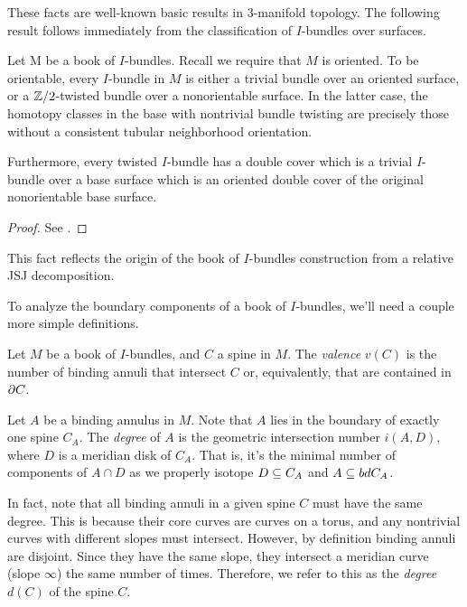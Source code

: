 These facts are well-known basic results in 3-manifold topology.  The following
result follows immediately from the classification of $I$-bundles over
surfaces.

\begin{prop}

Let M be a book of $I$-bundles. Recall we require that $M$ is oriented. To be
orientable, every $I$-bundle in $M$ is either a trivial bundle over an oriented
surface, or a $\mathbb{Z}/2$-twisted bundle over a nonorientable surface. In the
latter case, the homotopy classes in the base with nontrivial bundle twisting
are precisely those without a consistent tubular neighborhood orientation.

Furthermore, every twisted $I$-bundle has a double cover which is a trivial
$I$-bundle over a base surface which is an oriented double cover of the
original nonorientable base surface.

\end{prop}

\begin{proof}

See \cite[Theorem 10.5]{He}.

\end{proof}

This fact reflects the origin of the book of $I$-bundles construction from
a relative JSJ decomposition.

To analyze the boundary components of a book of $I$-bundles, we'll need
a couple more simple definitions.

\begin{defn}

Let $M$ be a book of $I$-bundles, and $C$ a spine in $M$.  The \emph{valence}
$v(C)$ is the number of binding annuli that intersect $C$ or, equivalently,
that are contained in $\partial C$.

Let $A$ be a binding annulus in $M$. Note that $A$ lies in the boundary of
exactly one spine $C_A$. The \emph{degree} of $A$ is the geometric intersection
number $i(A,D)$, where $D$ is a meridian disk of $C_A$. That is, it's the
minimal number of components of $A \cap D$ as we properly isotope $D \subseteq C_A$
and $A \subseteq bd C_A$.

In fact, note that all binding annuli in a given spine $C$ must have the same
degree. This is because their core curves are curves on a torus, and any
nontrivial curves with different slopes must intersect. However, by definition
binding annuli are disjoint. Since they have the same slope, they intersect
a meridian curve (slope $\infty$) the same number of times.  Therefore, we
refer to this as the \emph{degree} $d(C)$ of the spine $C$.

\end{defn}

